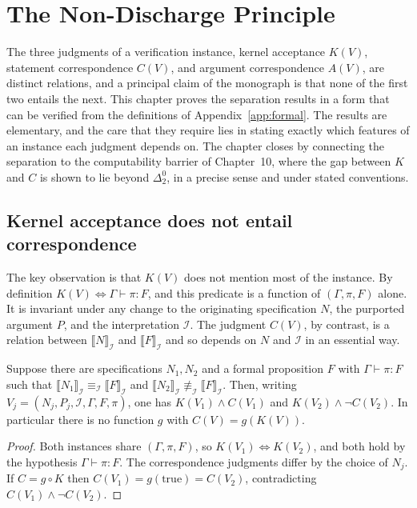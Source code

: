 \chapter{The Non-Discharge Principle}
\label{ch:nondischarge}

The three judgments of a verification instance, kernel acceptance $K(V)$, statement correspondence $C(V)$, and argument correspondence $A(V)$, are distinct relations, and a principal claim of the monograph is that none of the first two entails the next. This chapter proves the separation results in a form that can be verified from the definitions of Appendix~\ref{app:formal}. The results are elementary, and the care that they require lies in stating exactly which features of an instance each judgment depends on. The chapter closes by connecting the separation to the computability barrier of Chapter~10, where the gap between $K$ and $C$ is shown to lie beyond $\Delta^0_2$, in a precise sense and under stated conventions.

\section{Kernel acceptance does not entail correspondence}

The key observation is that $K(V)$ does not mention most of the instance. By definition $K(V) \Longleftrightarrow \Gamma \vdash \pi : F$, and this predicate is a function of $(\Gamma, \pi, F)$ alone. It is invariant under any change to the originating specification $N$, the purported argument $P$, and the interpretation $\mathcal{I}$. The judgment $C(V)$, by contrast, is a relation between $\llbracket N \rrbracket_{\mathcal{I}}$ and $\llbracket F \rrbracket_{\mathcal{I}}$ and so depends on $N$ and $\mathcal{I}$ in an essential way.

\begin{theorem}[RV-001]
\label{thm:rv001}
Suppose there are specifications $N_1, N_2$ and a formal proposition $F$ with $\Gamma \vdash \pi : F$ such that $\llbracket N_1 \rrbracket_{\mathcal{I}} \equiv_{\mathcal{I}} \llbracket F \rrbracket_{\mathcal{I}}$ and $\llbracket N_2 \rrbracket_{\mathcal{I}} \not\equiv_{\mathcal{I}} \llbracket F \rrbracket_{\mathcal{I}}$. Then, writing $V_j = (N_j, P_j, \mathcal{I}, \Gamma, F, \pi)$, one has $K(V_1) \wedge C(V_1)$ and $K(V_2) \wedge \neg C(V_2)$. In particular there is no function $g$ with $C(V) = g(K(V))$.
\end{theorem}

\begin{proof}
Both instances share $(\Gamma, \pi, F)$, so $K(V_1) \Longleftrightarrow K(V_2)$, and both hold by the hypothesis $\Gamma \vdash \pi : F$. The correspondence judgments differ by the choice of $N_j$. If $C = g \circ K$ then $C(V_1) = g(\text{true}) = C(V_2)$, contradicting $C(V_1) \wedge \neg C(V_2)$.
\end{proof}

